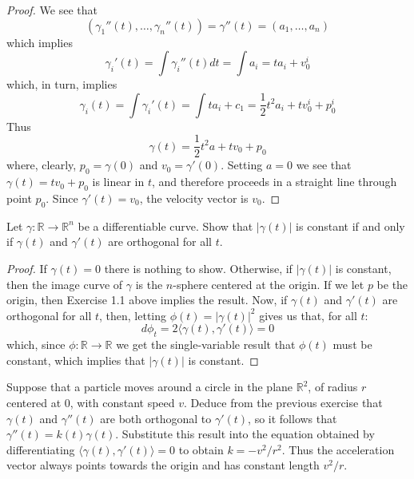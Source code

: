\begin{proof}
We see that
\[
(\gamma_1''(t), \ldots, \gamma_n''(t)) = \gamma''(t) = (a_1,\ldots,a_n)
\]
which implies
\[
\gamma_i'(t) = \int \gamma_i''(t)dt = \int a_i = ta_i+v_{0}^i
\]
which, in turn, implies
\[
\gamma_i(t) = \int \gamma_i'(t) = \int ta_i+c_1 = \frac{1}{2}t^2a_i+tv_{0}^i+p_{0}^i
\]
Thus
\[
\gamma(t) = \frac{1}{2}t^2a+tv_0+p_0
\]
where, clearly, \( p_0 = \gamma(0) \) and \( v_0 = \gamma'(0) \). Setting \( a = 0 \) we see that \( \gamma(t) = tv_0+p_0 \) is linear in \( t \), and therefore proceeds in a straight line through point \( p_0 \). Since \( \gamma'(t) = v_0 \), the velocity vector is \( v_0 \). 
\end{proof}

\question Let \( \gamma: \mathbb{R} \rightarrow \mathbb{R}^n \) be a differentiable curve. Show that \( \left| \gamma(t) \right| \) is constant if and only if \( \gamma(t) \) and \( \gamma'(t) \) are orthogonal for all \( t \).

\begin{proof}
If \( \gamma(t) = 0 \) there is nothing to show. Otherwise, if \( \left| \gamma(t) \right| \) is constant, then the image curve of \( \gamma \) is the \( n \)-sphere centered at the origin. If we let \( p \) be the origin, then Exercise 1.1 above implies the result. Now, if \( \gamma(t) \) and \( \gamma'(t) \) are orthogonal for all \( t \), then, letting \( \phi(t) = \left| \gamma(t) \right|^2 \) gives us that, for all \( t \):
\[
d\phi_t = 2 \langle \gamma(t), \gamma'(t) \rangle = 0
\]
which, since \( \phi: \mathbb{R} \rightarrow \mathbb{R} \) we get the single-variable result that \( \phi(t) \) must be constant, which implies that \( \left| \gamma(t) \right| \) is constant.
\end{proof}

\question Suppose that a particle moves around a circle in the plane \( \mathbb{R}^2 \), of radius \( r \) centered at \( 0 \), with constant speed \( v \). Deduce from the previous exercise that \( \gamma(t) \) and \( \gamma''(t) \) are both orthogonal to \( \gamma'(t) \), so it follows that \( \gamma''(t) = k(t)\gamma(t) \). Substitute this result into the equation obtained by differentiating \( \langle \gamma(t), \gamma'(t) \rangle = 0 \) to obtain \( k = -v^2/r^2 \). Thus the acceleration vector always points towards the origin and has constant length \( v^2/r \).

